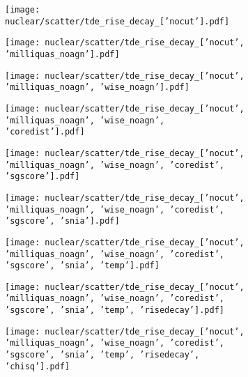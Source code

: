 \begin{figure}[htbp]
  \centering
  \begin{subfigure}[b]{0.49\textwidth}
    \centering
    \texttt{[image: nuclear/scatter/tde\_rise\_decay\_['nocut'].pdf]}
  \end{subfigure}
  \begin{subfigure}[b]{0.49\textwidth}
    \centering
    \texttt{[image: nuclear/scatter/tde\_rise\_decay\_['nocut', 'milliquas\_noagn'].pdf]}
  \end{subfigure}
  \begin{subfigure}[b]{0.49\textwidth}
    \centering
    \texttt{[image: nuclear/scatter/tde\_rise\_decay\_['nocut', 'milliquas\_noagn', 'wise\_noagn'].pdf]}
  \end{subfigure}
  \begin{subfigure}[b]{0.49\textwidth}
    \centering
    \texttt{[image: nuclear/scatter/tde\_rise\_decay\_['nocut', 'milliquas\_noagn', 'wise\_noagn', 'coredist'].pdf]}
  \end{subfigure}
  \begin{subfigure}[b]{0.49\textwidth}
    \centering
    \texttt{[image: nuclear/scatter/tde\_rise\_decay\_['nocut', 'milliquas\_noagn', 'wise\_noagn', 'coredist', 'sgscore'].pdf]}
  \end{subfigure}
  \begin{subfigure}[b]{0.49\textwidth}
    \centering
    \texttt{[image: nuclear/scatter/tde\_rise\_decay\_['nocut', 'milliquas\_noagn', 'wise\_noagn', 'coredist', 'sgscore', 'snia'].pdf]}
  \end{subfigure}
  \begin{subfigure}[b]{0.49\textwidth}
    \centering
    \texttt{[image: nuclear/scatter/tde\_rise\_decay\_['nocut', 'milliquas\_noagn', 'wise\_noagn', 'coredist', 'sgscore', 'snia', 'temp'].pdf]}
  \end{subfigure}
  \begin{subfigure}[b]{0.49\textwidth}
    \centering
    \texttt{[image: nuclear/scatter/tde\_rise\_decay\_['nocut', 'milliquas\_noagn', 'wise\_noagn', 'coredist', 'sgscore', 'snia', 'temp', 'risedecay'].pdf]}
  \end{subfigure}
  \begin{subfigure}[b]{0.49\textwidth}
    \centering
    \texttt{[image: nuclear/scatter/tde\_rise\_decay\_['nocut', 'milliquas\_noagn', 'wise\_noagn', 'coredist', 'sgscore', 'snia', 'temp', 'risedecay', 'chisq'].pdf]}

\end{subfigure}
\end{figure}
